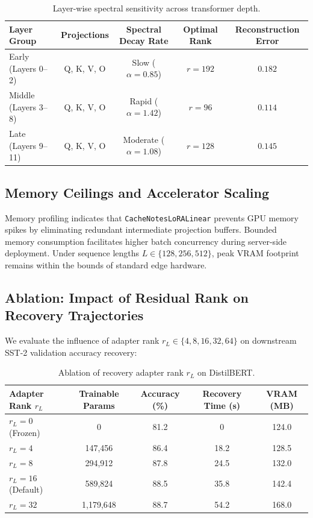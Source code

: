 \begin{table}[H]
\centering
\small
\begin{tabular}{lcccc}
\toprule
\textbf{Layer Group} & \textbf{Projections} & \textbf{Spectral Decay Rate} & \textbf{Optimal Rank} & \textbf{Reconstruction Error} \\
\midrule
Early (Layers 0--2) & Q, K, V, O & Slow ($\alpha = 0.85$) & $r=192$ & $0.182$ \\
Middle (Layers 3--8) & Q, K, V, O & Rapid ($\alpha = 1.42$) & $r=96$ & $0.114$ \\
Late (Layers 9--11) & Q, K, V, O & Moderate ($\alpha = 1.08$) & $r=128$ & $0.145$ \\
\bottomrule
\end{tabular}
\caption{Layer-wise spectral sensitivity across transformer depth.}
\label{tab:layer_sensitivity}
\end{table}

\subsection{Memory Ceilings and Accelerator Scaling}
Memory profiling indicates that \texttt{CacheNotesLoRALinear} prevents GPU memory spikes by eliminating redundant intermediate projection buffers. Bounded memory consumption facilitates higher batch concurrency during server-side deployment. Under sequence lengths $L \in \{128, 256, 512\}$, peak VRAM footprint remains within the bounds of standard edge hardware.

\subsection{Ablation: Impact of Residual Rank on Recovery Trajectories}
We evaluate the influence of adapter rank $r_L \in \{4, 8, 16, 32, 64\}$ on downstream SST-2 validation accuracy recovery:
\begin{table}[H]
\centering
\small
\begin{tabular}{lcccc}
\toprule
\textbf{Adapter Rank $r_L$} & \textbf{Trainable Params} & \textbf{Accuracy (\%)} & \textbf{Recovery Time (s)} & \textbf{VRAM (MB)} \\
\midrule
$r_L = 0$ (Frozen) & 0 & 81.2 & 0 & 124.0 \\
$r_L = 4$ & 147,456 & 86.4 & 18.2 & 128.5 \\
$r_L = 8$ & 294,912 & 87.8 & 24.5 & 132.0 \\
$r_L = 16$ (Default) & 589,824 & 88.5 & 35.8 & 142.4 \\
$r_L = 32$ & 1,179,648 & 88.7 & 54.2 & 168.0 \\
\bottomrule
\end{tabular}
\caption{Ablation of recovery adapter rank $r_L$ on DistilBERT.}
\label{tab:ablation_adapter_rank}
\end{table}

